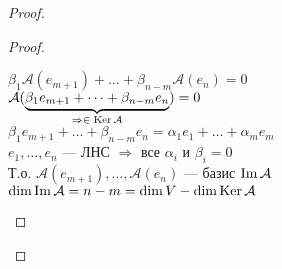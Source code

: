 \begin{theorem-non}
\begin{proof}
\begin{proof}
            \begin{center}
                $\beta_1\mathcal{A}(e_{m+1}) + \dots + \beta_{n - m}\mathcal{A}(e_{n}) = 0$ \\
                 $\mathcal{A}(
                     \underbrace{\beta_1e_{m+1} + \dots + \beta_{n-m}e_n}_{\text{$\Rightarrow \in \operatorname{Ker} \mathcal{A}$}}
                     ) = 0$ \\
                    $\beta_1e_{m+1} + \dots + \beta_{n-m}e_n = \alpha_1e_1 + \dots + \alpha_me_m$ \\
                    $e_1, \dots, e_n$ --- ЛНС $\Longrightarrow $ все $\alpha_i$ и $ \beta_i = 0$ \\
                    Т.о. $\mathcal{A}(e_{m+1}), \dots, \mathcal{A}(e_n)$ --- базис $\operatorname{Im} \mathcal{A}$ \\
                    $\dim \operatorname{Im} \mathcal{A} = n - m = \dim V - \dim \operatorname{Ker} \mathcal{A}$
            \end{center}


        \end{proof}
    \end{proof}

\end{theorem-non}